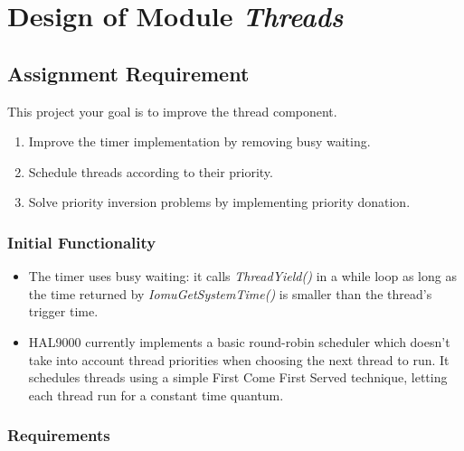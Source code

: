 \documentclass{report}
\begin{document}
\chapter{ Design of Module \textit{Threads} }


 
\section{Assignment Requirement}
	\item This project your goal is to improve the thread component.
		\begin{enumerate}
			\item Improve the timer implementation by removing busy waiting.
			\item Schedule threads according to their priority.
			\item Solve priority inversion problems by implementing priority donation.
		\end{enumerate}

\subsection{Initial Functionality}
	\begin{itemize}
		\item The timer uses busy waiting: it calls \textit{ThreadYield()} in a while loop as long as the time returned by \textit{IomuGetSystemTime()} is smaller than
			  the thread's trigger time.
		\item HAL9000 currently implements a basic round-robin scheduler which doesn't take into account thread priorities when choosing the next thread to run.
			  It schedules threads using a simple First Come First Served technique, letting each thread run for a constant time quantum.
	\end{itemize}
\subsection{Requirements}
\end{document}
